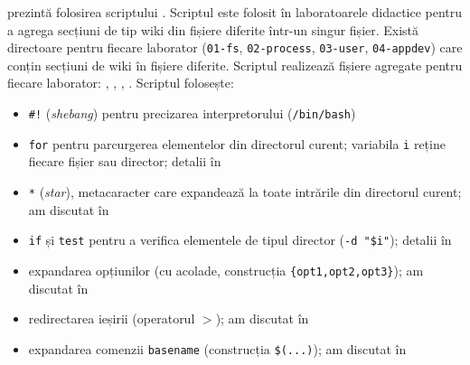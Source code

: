  prezintă folosirea scriptului .
Scriptul este folosit în laboratoarele didactice pentru a agrega secțiuni de tip wiki din fișiere diferite într-un singur fișier.
Există directoare pentru fiecare laborator (\texttt{01-fs}, \texttt{02-process}, \texttt{03-user}, \texttt{04-appdev}) care conțin secțiuni de wiki în fișiere diferite.
Scriptul realizează fișiere agregate pentru fiecare laborator: , , , .
Scriptul folosește:
\begin{itemize}
  \item \texttt{\#!} (\textit{shebang}) pentru precizarea interpretorului (\texttt{/bin/bash})
  \item \texttt{for} pentru parcurgerea elementelor din directorul curent; variabila \texttt{i} reține fiecare fișier sau director; detalii în 
  \item \texttt{*} (\textit{star}), metacaracter care expandează la toate intrările din directorul curent; am discutat în 
  \item \texttt{if} și \texttt{test} pentru a verifica elementele de tipul director (\texttt{-d "\$i"}); detalii în 
  \item expandarea opțiunilor (cu acolade, construcția \verb|{opt1,opt2,opt3}|); am discutat în 
  \item redirectarea ieșirii (operatorul \texttt{$>$}); am discutat în 
  \item expandarea comenzii \texttt{basename} (construcția \verb|$(...)|); am discutat în 
\end{itemize}

